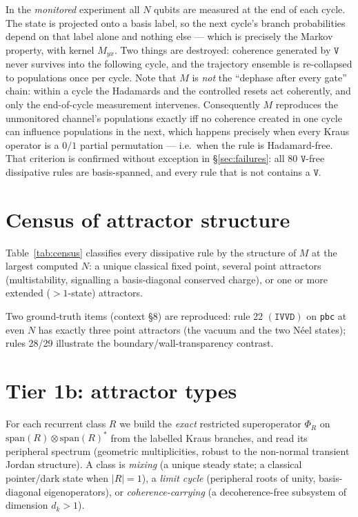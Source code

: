 \documentclass[11pt]{article}
\newcommand{\rt}[1]{\texttt{#1}}
\begin{document}
In the \emph{monitored} experiment all $N$ qubits are measured at the end of each
cycle. The state is projected onto a basis label, so the next cycle's branch
probabilities depend on that label alone and nothing else --- which is precisely
the Markov property, with kernel $M_{yx}$. Two things are destroyed: coherence
generated by $\rt V$ never survives into the following cycle, and the trajectory
ensemble is re-collapsed to populations once per cycle. Note that $M$ is
\emph{not} the ``dephase after every gate'' chain: within a cycle the Hadamards
and the controlled resets act coherently, and only the end-of-cycle measurement
intervenes. Consequently $M$ reproduces the unmonitored channel's populations
exactly iff no coherence created in one cycle can influence populations in the
next, which happens precisely when every Kraus operator is a $0/1$ partial
permutation --- i.e.\ when the rule is Hadamard-free. That criterion is confirmed
without exception in \S\ref{sec:failures}: all $80$ $\rt V$-free dissipative
rules are basis-spanned, and every rule that is not contains a $\rt V$.

\section{Census of attractor structure}
\label{sec:census}
Table~\ref{tab:census} classifies every dissipative rule by the structure of $M$
at the largest computed $N$: a unique classical fixed point, several point
attractors (multistability, signalling a basis-diagonal conserved charge), or one
or more extended ($>\!1$-state) attractors.
\begin{table}[h]\centering\small
\caption{Dissipative rules by attractor structure of the monitored chain $M$ and
boundary convention.}
\label{tab:census}\end{table}

Two ground-truth items (context \S8) are reproduced: rule 22 $(\rt{IVVD})$ on
\rt{pbc} at even $N$ has exactly three point attractors (the vacuum and the two
N\'eel states); rules 28/29 illustrate the boundary/wall-transparency contrast.

\section{Tier 1b: attractor types}
For each recurrent class $R$ we build the \emph{exact} restricted superoperator
$\Phi_R$ on $\mathrm{span}(R)\otimes\mathrm{span}(R)^*$ from the labelled Kraus
branches, and read its peripheral spectrum (geometric multiplicities, robust to
the non-normal transient Jordan structure). A class is \emph{mixing} (a unique
steady state; a classical pointer/dark state when $|R|=1$), a \emph{limit cycle}
(peripheral roots of unity, basis-diagonal eigenoperators), or
\emph{coherence-carrying} (a decoherence-free subsystem of dimension $d_k>1$).
\begin{table}[h]\centering\small
\caption{Tier-1b attractor classification (pbc, $N=8$). Rule 28 carries
coherence-protecting extended attractors ($d_k>1$); most others relax to
classical pointer states.}
\label{tab:tier1b}\end{table}
\end{document}
